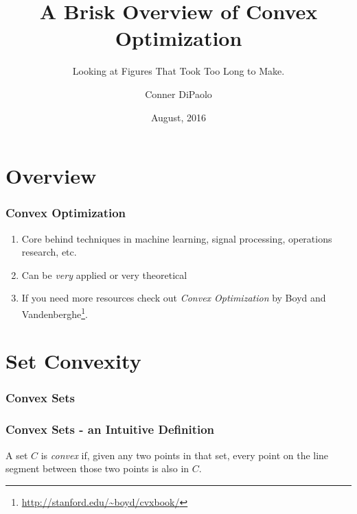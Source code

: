 \documentclass{beamer}
\title{A Brisk Overview of Convex Optimization}
\subtitle{Looking at Figures That Took Too Long to Make.}
\author{Conner DiPaolo}
\institute{Harvey Mudd College / Yelp}
\date{August, 2016}
\begin{document}
\frame{\titlepage}

\section{Overview}
\begin{frame}
    \frametitle{Convex Optimization}
    \begin{enumerate}
        \item Core behind techniques in machine learning, signal processing, operations research, etc.
        \item Can be \textit{very} applied or very theoretical
        \item If you need more resources check out \textit{Convex Optimization} by Boyd and
            Vandenberghe\footnote{\url{http://stanford.edu/~boyd/cvxbook/}}.
    \end{enumerate}
\end{frame}

\section{Set Convexity}
\begin{frame}
    \frametitle{Convex Sets}
    \begin{center}
    \end{center}
\end{frame}

\begin{frame}
    \frametitle{Convex Sets - an Intuitive Definition}
    A set $C$ is \textit{convex} if, given any two points in that set, every point on the line
    segment between those two points is also in $C$.
\end{frame}
\end{document}
